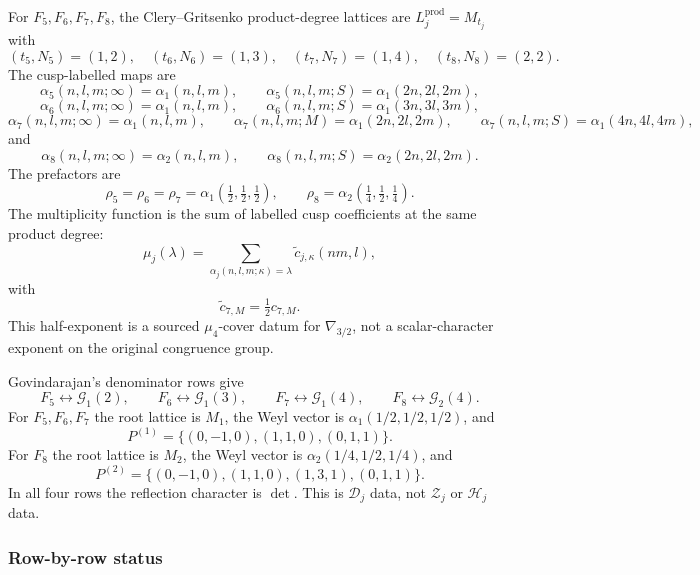 For \(F_5,F_6,F_7,F_8\), the Clery--Gritsenko product-degree lattices
are \(L_j^{\mathrm{prod}}=M_{t_j}\) with
\[
(t_5,N_5)=(1,2),\quad (t_6,N_6)=(1,3),\quad
(t_7,N_7)=(1,4),\quad (t_8,N_8)=(2,2).
\]
The cusp-labelled maps are
\[
\alpha_5(n,l,m;\infty)=\alpha_1(n,l,m),\qquad
\alpha_5(n,l,m;S)=\alpha_1(2n,2l,2m),
\]
\[
\alpha_6(n,l,m;\infty)=\alpha_1(n,l,m),\qquad
\alpha_6(n,l,m;S)=\alpha_1(3n,3l,3m),
\]
\[
\alpha_7(n,l,m;\infty)=\alpha_1(n,l,m),\qquad
\alpha_7(n,l,m;M)=\alpha_1(2n,2l,2m),\qquad
\alpha_7(n,l,m;S)=\alpha_1(4n,4l,4m),
\]
and
\[
\alpha_8(n,l,m;\infty)=\alpha_2(n,l,m),\qquad
\alpha_8(n,l,m;S)=\alpha_2(2n,2l,2m).
\]
The prefactors are
\[
\rho_5=\rho_6=\rho_7=\alpha_1(\tfrac12,\tfrac12,\tfrac12),
\qquad
\rho_8=\alpha_2(\tfrac14,\tfrac12,\tfrac14).
\]
The multiplicity function is the sum of labelled cusp coefficients at
the same product degree:
\[
\mu_j(\lambda)=
\sum_{\alpha_j(n,l,m;\kappa)=\lambda}
\widetilde c_{j,\kappa}(nm,l),
\]
with
\[
\widetilde c_{7,M}=\tfrac12 c_{7,M}.
\]
This half-exponent is a sourced \(\mu_4\)-cover datum for
\(\nabla_{3/2}\), not a scalar-character exponent on the original
congruence group.

Govindarajan's denominator rows give
\[
F_5\leftrightarrow \mathcal G_1(2),\qquad
F_6\leftrightarrow \mathcal G_1(3),\qquad
F_7\leftrightarrow \mathcal G_1(4),\qquad
F_8\leftrightarrow \mathcal G_2(4).
\]
For \(F_5,F_6,F_7\) the root lattice is \(M_1\), the Weyl vector is
\(\alpha_1(1/2,1/2,1/2)\), and
\[
P^{(1)}=\{(0,-1,0),(1,1,0),(0,1,1)\}.
\]
For \(F_8\) the root lattice is \(M_2\), the Weyl vector is
\(\alpha_2(1/4,1/2,1/4)\), and
\[
P^{(2)}=\{(0,-1,0),(1,1,0),(1,3,1),(0,1,1)\}.
\]
In all four rows the reflection character is \(\det\).  This is
\(\mathscr D_j\) data, not \(\mathscr Z_j\) or \(\mathscr H_j\) data.

\subsubsection*{Row-by-row status}

